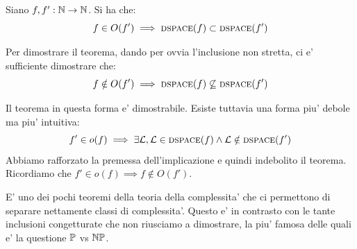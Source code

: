 \begin{thm}
    Siano $f,f':\mathbb{N} \to \mathbb{N}$. Si ha che:
    \begin{equation*}
        f \in O(f') \implies \textsc{dspace}(f) \subset \textsc{dspace}(f')
    \end{equation*}
\end{thm}

Per dimostrare il teorema, dando per ovvia l'inclusione non stretta, ci e' sufficiente dimostrare
che:
\begin{equation*}
    f \notin O(f') \implies \textsc{dspace}(f) \not\subseteq \textsc{dspace}(f')
\end{equation*}

Il teorema in questa forma e' dimostrabile. Esiste tuttavia una forma piu' debole ma piu' intuitiva:
\begin{equation*}
    f' \in o(f) \implies \exists \mathcal{L}, \mathcal{L} \in \textsc{dspace}(f) \land \mathcal{L} \notin \textsc{dspace}(f')
\end{equation*}
Abbiamo rafforzato la premessa dell'implicazione e quindi indebolito il teorema. Ricordiamo che $f'
\in o(f) \implies f \notin O(f')$.

E' uno dei pochi teoremi della teoria della complessita' che ci permettono di separare nettamente
classi di complessita'. Questo e' in contrasto con le tante inclusioni congetturate che non
riusciamo a dimostrare, la piu' famosa delle quali e' la questione $\mathbb{P}$  vs $\mathbb{NP}$.

